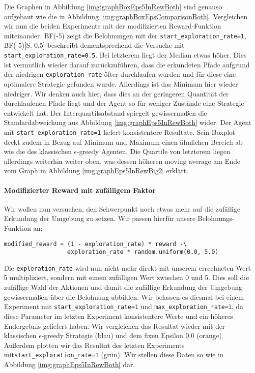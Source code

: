 Die Graphen in Abbildung \ref{img:graphBoxEps5InRewBoth} sind genauso aufgebaut wie die in Abbildung \ref{img:graphBoxEpsComparisonBoth}. Vergleichen wir nun die beiden Experimente mit der modifizierten Reward-Funktion miteinander. BF(-5) zeigt die Belohnungen mit der \texttt{start_exploration_rate=1}, BF(-5)[S. 0.5] beschreibt dementsprechend die Versuche mit \texttt{start_exploration_rate=0.5}. Bei letzterem liegt der Median etwas höher. Dies ist vermutlich wieder darauf zurückzuführen, dass die erkundeten Pfade aufgrund der niedrigen \texttt{exploration_rate} öfter durchlaufen wurden und für diese eine optimalere Strategie gefunden wurde. Allerdings ist das Minimum hier wieder niedriger. Wir denken auch hier, dass dies an der geringeren Quantität der durchlaufenen Pfade liegt und der Agent so für weniger Zustände eine Strategie entwickelt hat. Der Interquartilsabstand spiegelt gewissermaßen die Standardabweichung aus Abbildung \ref{img:graphEps5InRewBoth} wider. Der Agent mit \texttt{start_exploration_rate=1} liefert konsistentere Resultate. Sein Boxplot deckt zudem in Bezug auf Minimum und Maximum einen ähnlichen Bereich ab wie die des klassischen $ \epsilon $-greedy Agenten. Die Quartile von letzterem liegen allerdings weiterhin weiter oben, was dessen höheren moving average am Ende vom Graph in Abbildung \ref{img:graphEps5InRewBig2} erklärt.

\paragraph{Modifizierter Reward mit zufälligem Faktor}
Wir wollen nun versuchen, den Schwerpunkt noch etwas mehr auf die zufällige Erkundung der Umgebung zu setzen. Wir passen hierfür unsere Belohnungs-Funktion an:
\begin{verbatim}
modified_reward = (1 - exploration_rate) * reward -\
                  exploration_rate * random.uniform(0.0, 5.0)
\end{verbatim}
Die \texttt{exploration_rate} wird nun nicht mehr direkt mit unserem errechneten Wert 5 multipliziert, sondern mit einem zufälligen Wert zwischen 0 und 5. Dies soll die zufällige Wahl der Aktionen und damit die zufällige Erkundung der Umgebung gewissermaßen über die Belohnung abbilden. Wir belassen es diesmal bei einem Experiment mit \texttt{start_exploration_rate=1} und \texttt{max_exploration_rate=1}, da diese Parameter im letzten Experiment konsistentere Werte und ein höheres Endergebnis geliefert haben. Wir vergleichen das Resultat wieder mit der klassischen $ \epsilon $-greedy Strategie (blau) und dem fixen Epsilon 0.0 (orange). Außerdem plotten wir das Resultat des letzten Experiments mit\linebreak\texttt{start_exploration_rate=1} (grün). Wir stellen diese Daten so wie in Abbildung \ref{img:graphEps5InRewBoth} dar.

